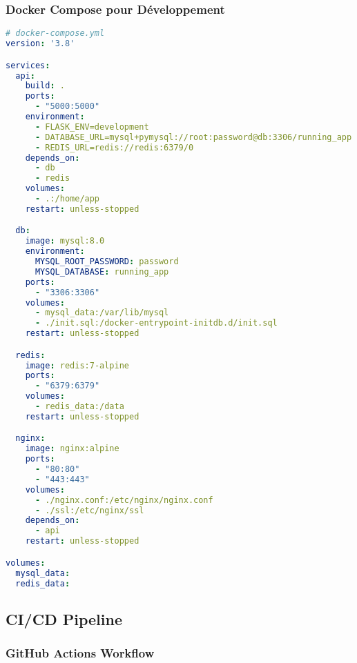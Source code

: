 \subsubsection{Docker Compose pour Développement}

\begin{lstlisting}[language=yaml]
# docker-compose.yml
version: '3.8'

services:
  api:
    build: .
    ports:
      - "5000:5000"
    environment:
      - FLASK_ENV=development
      - DATABASE_URL=mysql+pymysql://root:password@db:3306/running_app
      - REDIS_URL=redis://redis:6379/0
    depends_on:
      - db
      - redis
    volumes:
      - .:/home/app
    restart: unless-stopped

  db:
    image: mysql:8.0
    environment:
      MYSQL_ROOT_PASSWORD: password
      MYSQL_DATABASE: running_app
    ports:
      - "3306:3306"
    volumes:
      - mysql_data:/var/lib/mysql
      - ./init.sql:/docker-entrypoint-initdb.d/init.sql
    restart: unless-stopped

  redis:
    image: redis:7-alpine
    ports:
      - "6379:6379"
    volumes:
      - redis_data:/data
    restart: unless-stopped

  nginx:
    image: nginx:alpine
    ports:
      - "80:80"
      - "443:443"
    volumes:
      - ./nginx.conf:/etc/nginx/nginx.conf
      - ./ssl:/etc/nginx/ssl
    depends_on:
      - api
    restart: unless-stopped

volumes:
  mysql_data:
  redis_data:
\end{lstlisting}

\subsection{CI/CD Pipeline}

\subsubsection{GitHub Actions Workflow}


